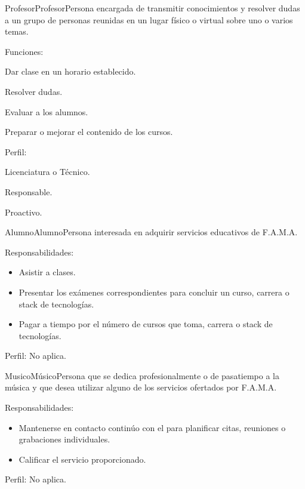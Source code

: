\begin{actor}{Profesor}{Profesor}{Persona encargada de transmitir conocimientos y resolver dudas a un grupo de personas reunidas en un lugar físico o virtual sobre uno o varios temas.}
\item[Funciones:]\cdtEmpty
	\begin{Citemize}
		\item Dar clase en un horario establecido.
		\item Resolver dudas.
		\item Evaluar a los alumnos.
		\item Preparar o mejorar el contenido de los cursos.	
	\end{Citemize}
\item[Perfil:]\cdtEmpty
	\begin{Citemize}
		\item Licenciatura o Técnico.
		\item Responsable.
		\item Proactivo.
	\end{Citemize}
\end{actor}

\begin{actor}{Alumno}{Alumno}{Persona interesada en adquirir servicios educativos de F.A.M.A.}
\item[Responsabilidades:]\cdtEmpty
	\begin{itemize}
		\item Asistir a clases.
		\item Presentar los exámenes correspondientes para concluir un curso, carrera o stack de tecnologías.
		\item Pagar a tiempo por el número de cursos que toma, carrera o stack de tecnologías.
	\end{itemize}
\item[Perfil:]No aplica.
\end{actor}

\begin{actor}{Musico}{Músico}{Persona que se dedica profesionalmente o de pasatiempo a la música y que desea utilizar alguno de los servicios ofertados por F.A.M.A.}
\item[Responsabilidades:]\cdtEmpty
	\begin{itemize}
		\item Mantenerse en contacto continúo con el  para planificar citas, reuniones o grabaciones individuales.
		\item Calificar el servicio proporcionado.
	\end{itemize}
\item[Perfil:] No aplica.
\end{actor}


